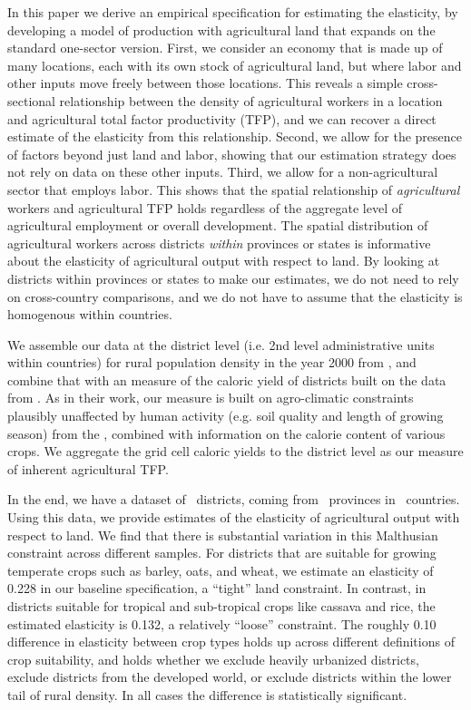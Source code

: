 \documentclass[11pt]{article}
\begin{document}
In this paper we derive an empirical specification for estimating the elasticity, by developing a model of production with agricultural land that expands on the standard one-sector version. First, we consider an economy that is made up of many locations, each with its own stock of agricultural land, but where labor and other inputs move freely between those locations. This reveals a simple cross-sectional relationship between the density of agricultural workers in a location and agricultural total factor productivity (TFP), and we can recover a direct estimate of the elasticity from this relationship. Second, we allow for the presence of factors beyond just land and labor, showing that our estimation strategy does not rely on data on these other inputs. Third, we allow for a non-agricultural sector that employs labor. This shows that the spatial relationship of \textit{agricultural} workers and agricultural TFP holds regardless of the aggregate level of agricultural employment or overall development. The spatial distribution of agricultural workers across districts \textit{within} provinces or states is informative about the elasticity of agricultural output with respect to land. By looking at districts within provinces or states to make our estimates, we do not need to rely on cross-country comparisons, and we do not have to assume that the elasticity is homogenous within countries.

We assemble our data at the district level (i.e. 2nd level administrative units within countries) for rural population density in the year 2000 from \citet{hyde31}, and combine that with an measure of the caloric yield of districts built on the data from \citet{galorozak2016}. As in their work, our measure is built on agro-climatic constraints plausibly unaffected by human activity (e.g. soil quality and length of growing season) from the \citet{gaez}, combined with information on the calorie content of various crops. We aggregate the grid cell caloric yields to the district level as our measure of inherent agricultural TFP.

In the end, we have a dataset of \districts \ districts, coming from \provinces \ provinces in \countries \ countries. Using this data, we provide estimates of the elasticity of agricultural output with respect to land. We find that there is substantial variation in this Malthusian constraint across different samples. For districts that are suitable for growing temperate crops such as barley, oats, and wheat, we estimate an elasticity of 0.228 in our baseline specification, a ``tight'' land constraint. In contrast, in districts suitable for tropical and sub-tropical crops like cassava and rice, the estimated elasticity is 0.132, a relatively ``loose'' constraint. The roughly 0.10 difference in elasticity between crop types holds up across different definitions of crop suitability, and holds whether we exclude heavily urbanized districts, exclude districts from the developed world, or exclude districts within the lower tail of rural density. In all cases the difference is statistically significant.
\end{document}
